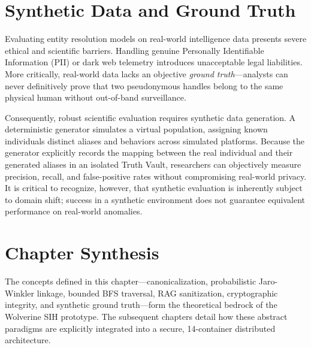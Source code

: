 \section{Synthetic Data and Ground Truth}
\label{sec:foundations-synthetic}
Evaluating entity resolution models on real-world intelligence data presents severe ethical and scientific barriers. Handling genuine Personally Identifiable Information (PII) or dark web telemetry introduces unacceptable legal liabilities. More critically, real-world data lacks an objective \textit{ground truth}—analysts can never definitively prove that two pseudonymous handles belong to the same physical human without out-of-band surveillance.

Consequently, robust scientific evaluation requires synthetic data generation. A deterministic generator simulates a virtual population, assigning known individuals distinct aliases and behaviors across simulated platforms. Because the generator explicitly records the mapping between the real individual and their generated aliases in an isolated Truth Vault, researchers can objectively measure precision, recall, and false-positive rates without compromising real-world privacy. It is critical to recognize, however, that synthetic evaluation is inherently subject to domain shift; success in a synthetic environment does not guarantee equivalent performance on real-world anomalies.

\section{Chapter Synthesis}
\label{sec:foundations-synthesis}
The concepts defined in this chapter—canonicalization, probabilistic Jaro-Winkler linkage, bounded BFS traversal, RAG sanitization, cryptographic integrity, and synthetic ground truth—form the theoretical bedrock of the Wolverine SIH prototype. The subsequent chapters detail how these abstract paradigms are explicitly integrated into a secure, 14-container distributed architecture.
